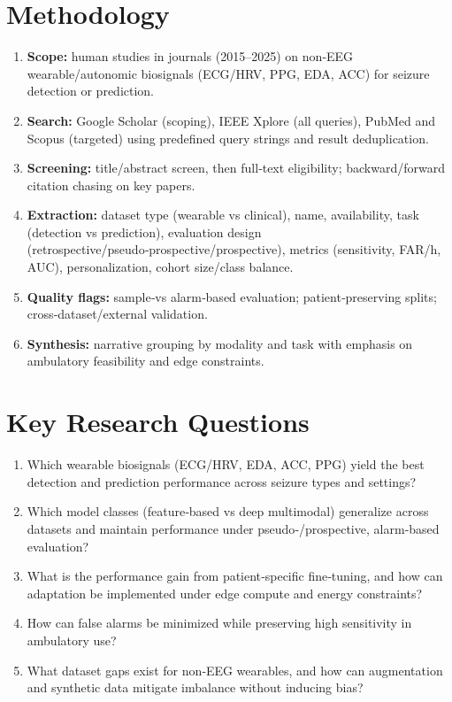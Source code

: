 \section{Methodology}
\begin{enumerate}
    \item \textbf{Scope:} human studies in journals (2015--2025) on non‑EEG wearable/autonomic biosignals (ECG/HRV, PPG, EDA, ACC) for seizure detection or prediction.
    \item \textbf{Search:} Google Scholar (scoping), IEEE Xplore (all queries), PubMed and Scopus (targeted) using predefined query strings and result deduplication.
    \item \textbf{Screening:} title/abstract screen, then full‑text eligibility; backward/forward citation chasing on key papers.
    \item \textbf{Extraction:} dataset type (wearable vs clinical), name, availability, task (detection vs prediction), evaluation design (retrospective/pseudo‑prospective/prospective), metrics (sensitivity, FAR/h, AUC), personalization, cohort size/class balance.
    \item \textbf{Quality flags:} sample‑vs alarm‑based evaluation; patient‑preserving splits; cross‑dataset/external validation.
    \item \textbf{Synthesis:} narrative grouping by modality and task with emphasis on ambulatory feasibility and edge constraints.
\end{enumerate}

\section{Key Research Questions}
\begin{enumerate}
    \item Which wearable biosignals (ECG/HRV, EDA, ACC, PPG) yield the best detection and prediction performance across seizure types and settings?
    \item Which model classes (feature‑based vs deep multimodal) generalize across datasets and maintain performance under pseudo‑/prospective, alarm‑based evaluation?
    \item What is the performance gain from patient‑specific fine‑tuning, and how can adaptation be implemented under edge compute and energy constraints?
    \item How can false alarms be minimized while preserving high sensitivity in ambulatory use?
    \item What dataset gaps exist for non‑EEG wearables, and how can augmentation and synthetic data mitigate imbalance without inducing bias?
\end{enumerate}

